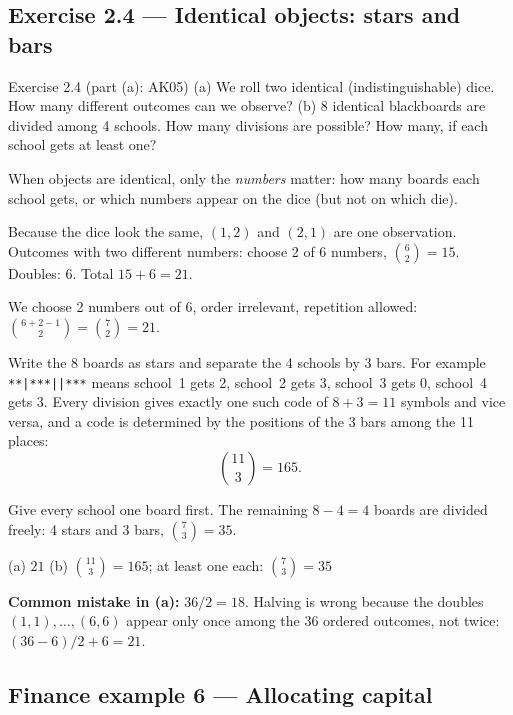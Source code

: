 \subsection{Exercise 2.4 --- Identical objects: stars and bars}

\begin{task}{Exercise 2.4 (part (a): AK05)}
	(a) We roll two identical (indistinguishable) dice. How many different
	outcomes can we observe?
	(b) 8 identical blackboards are divided among 4 schools. How many
	divisions are possible? How many, if each school gets at least one?
\end{task}
\workspace{3cm}

\ifsolutions
	\soltitle
	\idea When objects are identical, only the \emph{numbers} matter: how many
	boards each school gets, or which numbers appear on the dice (but not on
	which die).

	 Because the dice look the same, $(1,2)$ and $(2,1)$
	are one observation. Outcomes with two different numbers: choose 2 of 6
	numbers, $\binom62=15$. Doubles: $6$. Total $15+6=21$.

	 We choose 2 numbers out of 6, order irrelevant,
	repetition allowed: $\binom{6+2-1}{2}=\binom72=21$.

	 Write the 8 boards as stars and separate the 4
	schools by 3 bars. For example \texttt{**|***||***} means school~1 gets 2,
	school~2 gets 3, school~3 gets 0, school~4 gets 3. Every division gives
	exactly one such code of $8+3=11$ symbols and vice versa, and a code is
	determined by the positions of the 3 bars among the 11 places:
	\[ \binom{11}{3}=165. \]

	 Give every school one board first. The
	remaining $8-4=4$ boards are divided freely: 4 stars and 3 bars,
	$\binom{7}{3}=35$.
	\begin{answer}
		(a) $21$ \qquad (b) $\binom{11}3=165$; at least one each:
		$\binom73=35$
	\end{answer}
	\begin{remark}
		\textbf{Common mistake in (a):} $36/2=18$. Halving is wrong because the
		doubles $(1,1),\dots,(6,6)$ appear only once among the 36 ordered
		outcomes, not twice: $(36-6)/2+6=21$.
	\end{remark}
\fi

\subsection{Finance example 6 --- Allocating capital}

